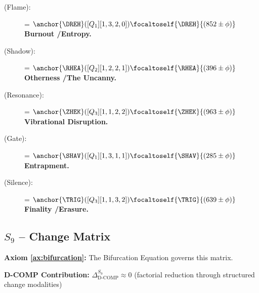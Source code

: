 \begin{description}
    \item[\DREH{} (Flame):] \drehrim = $\anchor{\DREH}([Q_1][1,3,2,0]) \focaltoself{\DREH}{(852 \pm \phi)}$\, \\
    \textbf{Burnout \slash Entropy.}

    \item[\RHEA{} (Shadow):] \rheaandh = $\anchor{\RHEA}([Q_2][1,2,2,1]) \focaltoself{\RHEA}{(396 \pm \phi)}$\, \\
    \textbf{Otherness \slash The Uncanny.}

    \item[\ZHEK{} (Resonance):] \zheklokh = $\anchor{\ZHEK}([Q_3][1,1,2,2]) \focaltoself{\ZHEK}{(963 \pm \phi)}$\, \\
    \textbf{Vibrational Disruption.}

    \item[\SHAV{} (Gate):] \shavporu = $\anchor{\SHAV}([Q_1][1,3,1,1]) \focaltoself{\SHAV}{(285 \pm \phi)}$\, \\
    \textbf{Entrapment.}

    \item[\TRIG{} (Silence):] \trigconti = $\anchor{\TRIG}([Q_3][1,1,3,2]) \focaltoself{\TRIG}{(639 \pm \phi)}$\, \\
    \textbf{Finality \slash Erasure.}
\end{description}

\subsection{$S_{9}$ -- Change Matrix}\label{sec:19.3}

\textbf{Axiom \ref{ax:bifurcation}:} The Bifurcation Equation governs this matrix.

\textbf{D-COMP Contribution:} $\Delta_{\text{D-COMP}}^{S_9} \approx 0$ (factorial reduction through structured change modalities)

